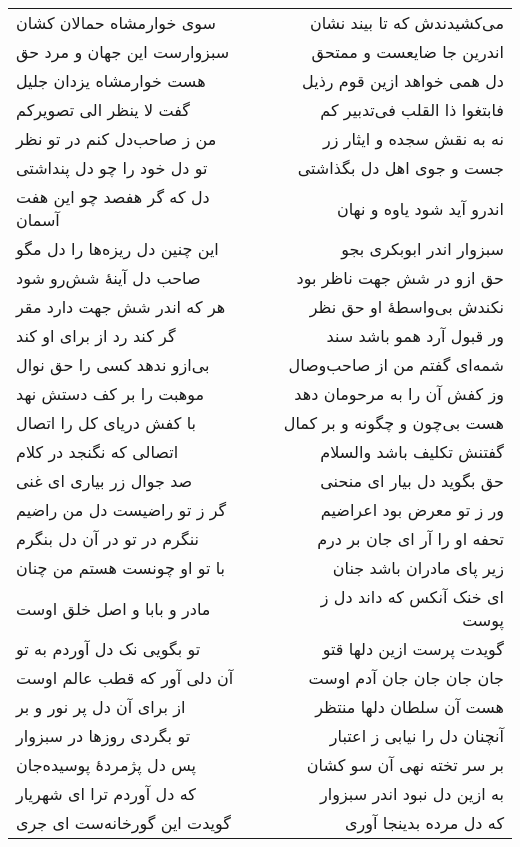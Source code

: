 \begin{center}
\begin{longtable}{l p{0.5cm} r}
سوی خوارمشاه حمالان کشان
&&
می‌کشیدندش که تا بیند نشان
\\
سبزوارست این جهان و مرد حق
&&
اندرین جا ضایعست و ممتحق
\\
هست خوارمشاه یزدان جلیل
&&
دل همی خواهد ازین قوم رذیل
\\
گفت لا ینظر الی تصویرکم
&&
فابتغوا ذا القلب فی‌تدبیر کم
\\
من ز صاحب‌دل کنم در تو نظر
&&
نه به نقش سجده و ایثار زر
\\
تو دل خود را چو دل پنداشتی
&&
جست و جوی اهل دل بگذاشتی
\\
دل که گر هفصد چو این هفت آسمان
&&
اندرو آید شود یاوه و نهان
\\
این چنین دل ریزه‌ها را دل مگو
&&
سبزوار اندر ابوبکری بجو
\\
صاحب دل آینهٔ شش‌رو شود
&&
حق ازو در شش جهت ناظر بود
\\
هر که اندر شش جهت دارد مقر
&&
نکندش بی‌واسطهٔ او حق نظر
\\
گر کند رد از برای او کند
&&
ور قبول آرد همو باشد سند
\\
بی‌ازو ندهد کسی را حق نوال
&&
شمه‌ای گفتم من از صاحب‌وصال
\\
موهبت را بر کف دستش نهد
&&
وز کفش آن را به مرحومان دهد
\\
با کفش دریای کل را اتصال
&&
هست بی‌چون و چگونه و بر کمال
\\
اتصالی که نگنجد در کلام
&&
گفتنش تکلیف باشد والسلام
\\
صد جوال زر بیاری ای غنی
&&
حق بگوید دل بیار ای منحنی
\\
گر ز تو راضیست دل من راضیم
&&
ور ز تو معرض بود اعراضیم
\\
ننگرم در تو در آن دل بنگرم
&&
تحفه او را آر ای جان بر درم
\\
با تو او چونست هستم من چنان
&&
زیر پای مادران باشد جنان
\\
مادر و بابا و اصل خلق اوست
&&
ای خنک آنکس که داند دل ز پوست
\\
تو بگویی نک دل آوردم به تو
&&
گویدت پرست ازین دلها قتو
\\
آن دلی آور که قطب عالم اوست
&&
جان جان جان جان آدم اوست
\\
از برای آن دل پر نور و بر
&&
هست آن سلطان دلها منتظر
\\
تو بگردی روزها در سبزوار
&&
آنچنان دل را نیابی ز اعتبار
\\
پس دل پژمردهٔ پوسیده‌جان
&&
بر سر تخته نهی آن سو کشان
\\
که دل آوردم ترا ای شهریار
&&
به ازین دل نبود اندر سبزوار
\\
گویدت این گورخانه‌ست ای جری
&&
که دل مرده بدینجا آوری

\end{longtable}
\end{center}

